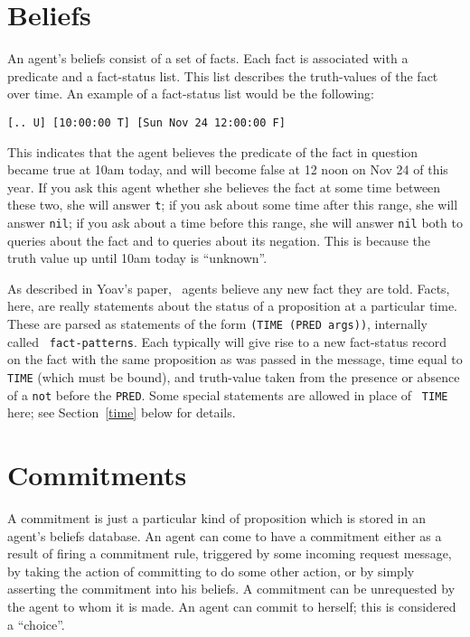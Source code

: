\section{Beliefs}

An agent's beliefs consist of a set of facts.  Each fact is associated
with a predicate and a fact-status list.  This list describes the
truth-values of the fact over time.  An example of a fact-status list
would be the following:

\begin{verbatim}
[.. U] [10:00:00 T] [Sun Nov 24 12:00:00 F]
\end{verbatim}

This indicates that the agent believes the predicate of the fact in
question became true at 10am today, and will become false at 12 noon
on Nov 24 of this year.  If you ask this agent whether she believes
the fact at some time between these two, she will answer {\tt t}; if
you ask about some time after this range, she will answer {\tt nil};
if you ask about a time before this range, she will answer {\tt nil}
both to queries about the fact and to queries about its negation.
This is because the truth value up until 10am today is ``unknown''.

As described in Yoav's paper, \ao\ agents believe any new fact they
are told.  Facts, here, are really statements about the status of a
proposition at a particular time.  These are parsed as statements of
the form {\tt (TIME (PRED {args}))}, internally called {\tt
fact-patterns}.  Each typically will give rise to a new fact-status
record on the fact with the same proposition as was passed in the
message, time equal to {\tt TIME} (which must be bound), and
truth-value taken from the presence or absence of a {\tt not} before
the {\tt PRED}.  Some special statements are allowed in place of {\tt
TIME} here; see Section~\ref{time} below for details.


\section{Commitments}

A commitment is just a particular kind of proposition which is stored
in an agent's beliefs database.  An agent can come to have a
commitment either as a result of firing a commitment rule, triggered
by some incoming request message, by taking the action of committing
to do some other action, or by simply asserting the commitment into
his beliefs.  A commitment can be unrequested by the agent to whom it
is made.  An agent can commit to herself; this is considered a
``choice''.

